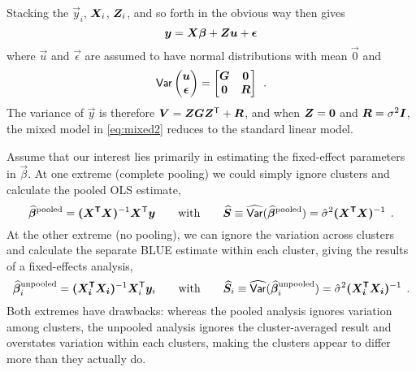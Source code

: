Stacking the $\vec{y}_i$, $\bm{X}_i$, $\bm{Z}_i$, and so forth in the obvious way then gives
\begin{equation}\label{eq:mixed2}
 \bm{y} = \bm{X} \bm{\beta} + \bm{Z} \bm{u} + \bm{\epsilon}
\end{equation}
where $\vec{u}$ and $\vec{\epsilon}$ are assumed to have normal distributions with mean $\vec{0}$
and
\begin{equation}\label{eq:mixed3}
 \mathsf{Var}
      \begin{pmatrix}
       \bm{u} \\ \bm{\epsilon}
      \end{pmatrix}
      =
      \begin{bmatrix}
      \bm{G} & \bm{0} \\ \bm{0} & \bm{R}
      \end{bmatrix} \:\: .
\end{equation}
The variance of $\vec{y}$ is therefore $\bm{V} = \bm{Z} \bm{G} \bm{Z}^\mathsf{T} + \bm{R}$, and when
$\bm{Z} = \bm{0}$ and $\bm{R} = \sigma^2 \bm{I}$, the mixed model in \eqref{eq:mixed2} reduces to the
standard linear model.

Assume that our interest lies primarily in estimating the fixed-effect parameters in $\vec{\beta}$.  At one extreme
(complete pooling) we could simply ignore clusters and calculate the pooled OLS estimate,
\begin{equation}\label{eq:mixed4}
 \widehat{\bm{\beta}}^{\textrm{pooled}} = \bm{(\bm{X}^\mathsf{T} \bm{X})}^{-1} \bm{X}^\mathsf{T} \bm{y}
 \quad\quad \textrm{with} \quad\quad
 \widehat{\bm{S}} \equiv \widehat{\mathsf{Var}}(\widehat{\bm{\beta}}^{\textrm{pooled}}) = \hat{\sigma}^2 \bm{(\bm{X}^\mathsf{T} \bm{X})}^{-1} \:\: .
\end{equation}
At the other extreme (no pooling), we can ignore the variation across clusters and calculate the
separate BLUE estimate within each cluster, giving the results of a fixed-effects analysis,
\begin{equation}\label{eq:mixed5}
 \widehat{\bm{\beta}}^{\textrm{unpooled}}_i = \bm{(\bm{X}_i^\mathsf{T} \bm{X}_i)}^{-1} \bm{X}_i^\mathsf{T} \bm{y}_i
 \quad\quad \textrm{with} \quad\quad
 \widehat{\bm{S}}_i \equiv \widehat{\mathsf{Var}}(\widehat{\bm{\beta}}^{\textrm{unpooled}}_i) = \hat{\sigma}^2 \bm{(\bm{X}_i^\mathsf{T} \bm{X}_i)}^{-1} \:\: .
\end{equation}
Both extremes have drawbacks:  whereas the pooled analysis ignores variation among clusters, the unpooled analysis ignores the
cluster-averaged result and overstates variation within each clusters, making the clusters appear to differ more than they actually do.

